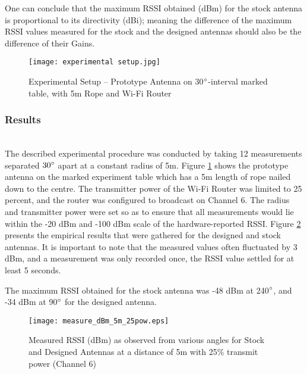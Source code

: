 \documentclass[10pt,twocolumn,hidelinks]{witseiepaper}
\begin{document}
One can conclude that the maximum RSSI obtained (dBm) for the stock antenna
is proportional to its directivity (dBi); meaning the difference of the
maximum RSSI values measured for the stock and the designed antennas should
also be the difference of their Gains.

\begin{figure}
    \centering
    \texttt{[image: experimental setup.jpg]}
    \caption{Experimental Setup -- Prototype Antenna on
        30$^\circ$-interval marked table, with 5m Rope and Wi-Fi Router}
    \label{fig:designexp}
    \vspace{-0.1cm}
\end{figure}


\subsubsection{Results}~\\
The described experimental procedure was conducted by taking 12
measurements separated $30^\circ$ apart at a constant radius of 5m. Figure
\ref{fig:designexp} shows the prototype antenna on the marked experiment
table which has a 5m length of rope nailed down to the centre. The
transmitter power of the Wi-Fi Router was limited to 25 percent, and the
router was configured to broadcast on Channel 6. The radius and transmitter
power were set so as to ensure that all measurements would lie within the
-20 dBm and -100 dBm scale of the hardware-reported RSSI. Figure
\ref{empirical} presents the empirical results that were gathered for the
designed and stock antennas. It is important to note that the measured
values often fluctuated by 3 dBm, and a measurement was only recorded once,
the RSSI value settled for at least 5 seconds.

The maximum RSSI obtained for the stock antenna was -48 dBm at
240$^\circ$, and -34 dBm at 90$^\circ$ for the designed antenna.

\begin{figure}
    \centering
    \texttt{[image: measure\_dBm\_5m\_25pow.eps]}
    \vspace{-1cm}
    \caption{Measured RSSI (dBm) as observed from various angles for Stock
        and Designed Antennas at a distance of 5m with 25\% transmit power
        (Channel 6)}
    \label{empirical}
    \vspace{-0.5cm}
\end{figure}
\end{document}

